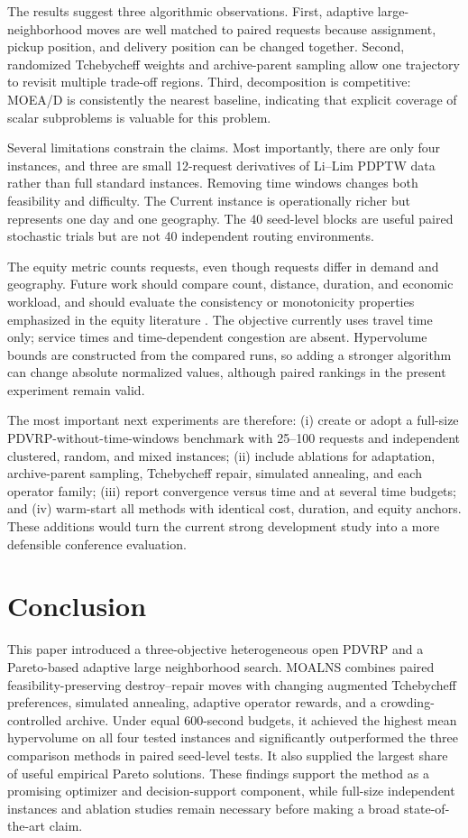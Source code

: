 \documentclass[11pt,a4paper]{article}
\newcommand{\MOALNS}{MOALNS}
\begin{document}
The results suggest three algorithmic observations. First, adaptive large-neighborhood moves are well matched to paired requests because assignment, pickup position, and delivery position can be changed together. Second, randomized Tchebycheff weights and archive-parent sampling allow one trajectory to revisit multiple trade-off regions. Third, decomposition is competitive: MOEA/D is consistently the nearest baseline, indicating that explicit coverage of scalar subproblems is valuable for this problem.

Several limitations constrain the claims. Most importantly, there are only four instances, and three are small 12-request derivatives of Li--Lim PDPTW data rather than full standard instances. Removing time windows changes both feasibility and difficulty. The Current instance is operationally richer but represents one day and one geography. The 40 seed-level blocks are useful paired stochastic trials but are not 40 independent routing environments.

The equity metric counts requests, even though requests differ in demand and geography. Future work should compare count, distance, duration, and economic workload, and should evaluate the consistency or monotonicity properties emphasized in the equity literature \cite{matl2018equity}. The objective currently uses travel time only; service times and time-dependent congestion are absent. Hypervolume bounds are constructed from the compared runs, so adding a stronger algorithm can change absolute normalized values, although paired rankings in the present experiment remain valid.

The most important next experiments are therefore: (i) create or adopt a full-size PDVRP-without-time-windows benchmark with 25--100 requests and independent clustered, random, and mixed instances; (ii) include ablations for adaptation, archive-parent sampling, Tchebycheff repair, simulated annealing, and each operator family; (iii) report convergence versus time and at several time budgets; and (iv) warm-start all methods with identical cost, duration, and equity anchors. These additions would turn the current strong development study into a more defensible conference evaluation.

\section{Conclusion}

This paper introduced a three-objective heterogeneous open PDVRP and a Pareto-based adaptive large neighborhood search. \MOALNS{} combines paired feasibility-preserving destroy--repair moves with changing augmented Tchebycheff preferences, simulated annealing, adaptive operator rewards, and a crowding-controlled archive. Under equal 600-second budgets, it achieved the highest mean hypervolume on all four tested instances and significantly outperformed the three comparison methods in paired seed-level tests. It also supplied the largest share of useful empirical Pareto solutions. These findings support the method as a promising optimizer and decision-support component, while full-size independent instances and ablation studies remain necessary before making a broad state-of-the-art claim.
\end{document}
